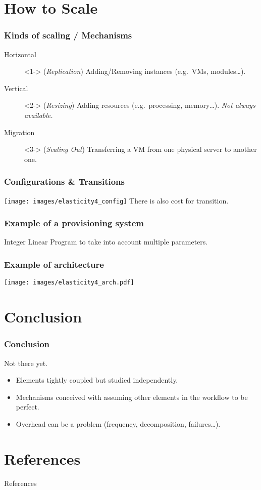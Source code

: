 \documentclass{beamer}
\begin{document}
\section{How to Scale}
\begin{frame}
  \frametitle{Kinds of scaling / Mechanisms}
  \begin{description}
    \item[Horizontal]<1-> (\textit{Replication}) Adding/Removing instances (e.g.\ VMs, modules\dots).
    \item[Vertical]<2-> (\textit{Resizing}) Adding resources (e.g.\ processing, memory\dots). \textit{Not always available.}
    \item[Migration]<3-> (\textit{Scaling Out}) Transferring a VM from one physical server to another one.
  \end{description}
\end{frame}

\begin{frame}
  \frametitle{Configurations \& Transitions}
  \texttt{[image: images/elasticity4\_config]}
  \vspace*{\fill}
  There is also cost for transition.
\end{frame}

\begin{frame}
  \frametitle{Example of a provisioning system~\cite{sharma2011cost}}
  Integer Linear Program to take into account multiple parameters.
\end{frame}

\begin{frame}
  \frametitle{Example of architecture~\cite{sharma2011cost}}
  \texttt{[image: images/elasticity4\_arch.pdf]}
\end{frame}


\section*{Conclusion}
\begin{frame}
  \frametitle{Conclusion}
  Not there yet.
  \begin{itemize}
    \item Elements tightly coupled but studied independently.
    \item Mechanisms conceived with assuming other elements in the workflow to be perfect.
    \item Overhead can be a problem (frequency, decomposition, failures\dots).
  \end{itemize}
\end{frame}


\appendix
\section*{References}
\begin{frame}[allowframebreaks]{References}
  
  
\end{frame}
\end{document}
